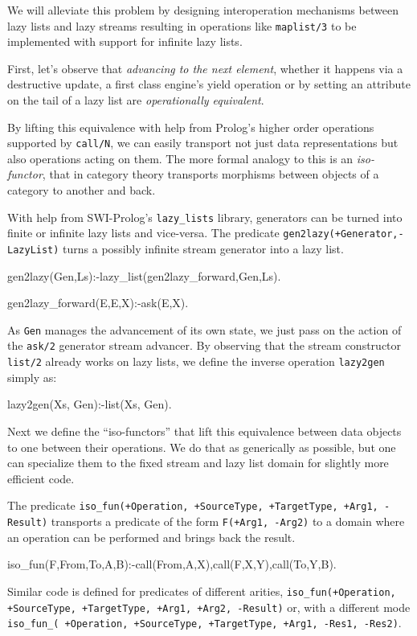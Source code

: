 \documentclass{new_tlp}
\begin{document}
We will alleviate this problem by designing interoperation mechanisms between lazy lists and lazy streams resulting in operations like {\tt maplist/3} to be implemented with support for infinite lazy lists.

First, let's observe that  {\em advancing to the next element}, 
whether it happens via a destructive update,
a first class engine's yield operation or by setting an attribute on the tail of
a lazy list are {\em operationally equivalent}.

By lifting this equivalence with help from Prolog's higher order operations
supported by {\tt call/N}, we can easily transport not just  data representations 
but also   operations acting on them.
The more formal analogy to this is an {\em iso-functor}, that in category theory
transports morphisms between objects of a category to another and back. 

With help from SWI-Prolog's {\tt lazy\_lists} library, 
generators can be turned into finite or infinite lazy lists and vice-versa.
The predicate {\tt gen2lazy(+Generator,-LazyList)} turns a possibly infinite
stream generator into a lazy list.
\begin{code} 
gen2lazy(Gen,Ls):-lazy_list(gen2lazy_forward,Gen,Ls).

gen2lazy_forward(E,E,X):-ask(E,X).
\end{code}
As {\tt Gen}  manages the advancement of its own state, 
we just pass on the action of the {\tt ask/2}
generator stream advancer.
By observing that the stream constructor {\tt list/2} already works
on lazy lists, we define the inverse operation {\tt lazy2gen} simply as:
\begin{code}
lazy2gen(Xs, Gen):-list(Xs, Gen).
\end{code}

Next we define the ``iso-functors'' that 
lift this equivalence between data objects to 
one between their operations. We do that as generically as possible,
but one can specialize them to the fixed stream and lazy list domain
for slightly more efficient code.

The predicate 
{\tt iso\_fun(+Operation, +SourceType, +TargetType, +Arg1, -Result)}
transports a predicate of the form {\tt F(+Arg1, -Arg2)} to a domain where
an operation can be performed and brings back the result.

\begin{code}
iso_fun(F,From,To,A,B):-call(From,A,X),call(F,X,Y),call(To,Y,B).
\end{code}
Similar code is defined for predicates of different arities,
{\tt iso\_fun(+Operation, +SourceType, +TargetType, +Arg1, +Arg2, -Result)} 
or, with a different mode
{\tt iso\_fun\_( +Operation, +SourceType, +TargetType, +Arg1, -Res1, -Res2)}.
\end{document}
